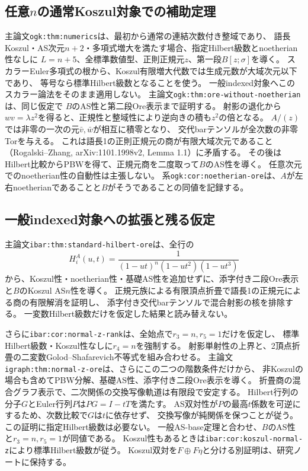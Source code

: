 \documentclass[11pt,a4paper]{ltjsarticle}
\begin{document}
\subsection{任意\texorpdfstring{$n$}{n}の通常Koszul対象での補助定理}
主論文\texttt{ogk:thm:numerics}は、最初から通常の連結次数付き整域であり、
語長Koszul・AS次元$n+2$・多項式増大を満たす場合、指定Hilbert級数とnoetherian性なしに
$L=n+5$、全標準数値型、正則正規元$z$、第一段$B[z;\sigma]$を導く。
スカラーEuler多項式の根から、Koszul有限増大代数では生成元数が大域次元以下であり、
等号なら標準Hilbert級数となることを使う。
一般indexed対象へこのスカラー論法をそのまま適用しない。
主論文\texttt{ogk:thm:ore-without-noetherian}は、同じ仮定で
$B$のAS性と第二段Ore表示まで証明する。
射影の退化から$wv=\lambda z^2$を得ると、正規性と整域性により逆向きの積も$z^2$の倍となる。
$A/(z)$では非零の一次の元$\bar v,\bar w$が相互に積零となり、
交代barテンソルが全次数の非零Torを与える。
これは語長1の正則正規元の商が有限大域次元であること
（Rogalski--Zhang, arXiv:1101.1998v2, Lemma 1.1）に矛盾する。
その後はHilbert比較からPBWを得て、正規元商を二度取って$B$のAS性を導く。
任意次元でのnoetherian性の自動性は主張しない。
系\texttt{ogk:cor:noetherian-ore}は、$A$が左右noetherianであることと$B$がそうであることの同値を記録する。

\subsection{一般indexed対象への拡張と残る仮定}
主論文\texttt{ibar:thm:standard-hilbert-ore}は、全行の
\[
H_i^A(u,t)=\frac1{(1-ut)^n(1-ut^2)(1-ut^3)}
\]
から、Koszul性・noetherian性・基礎AS性を追加せずに、添字付き二段Ore表示と$B$のKoszul AS$n$性を導く。
正規元族による有限頂点折畳で語長1の正規元による商の有限解消を証明し、
添字付き交代barテンソルで混合射影の核を排除する。
一変数Hilbert級数だけを仮定した結果と読み替えない。

さらに\texttt{ibar:cor:normal-z-rank}は、全始点で$r_3=n,r_5=1$だけを仮定し、
標準Hilbert級数・Koszul性なしに$r_4=n$を強制する。
射影単射性の上界と、2頂点折畳の二変数Golod--Shafarevich不等式を組み合わせる。
主論文\texttt{igraph:thm:normal-z-ore}は、さらにこの二つの階数条件だけから、
非Koszulの場合も含めてPBW分解、基礎AS性、添字付き二段Ore表示を導く。
折畳商の混合グラフ表示で、二次関係の交換写像軌道は有限段で安定する。
Hilbert行列の分子$G$とEuler行列$P$は$PG=I-tT$を満たす。
AS双対性が$P$の最高$t$係数を可逆にするため、次数比較で$G$は$t$に依存せず、
交換写像が純関係を保つことが従う。この証明に指定Hilbert級数は必要ない。
一般AS-base定理と合わせ、$B$のAS性と$r_3=n,r_5=1$が同値である。
Koszul性もあるときは\texttt{ibar:cor:koszul-normal-z}により標準Hilbert級数が従う。
Koszul双対を$F\oplus F\eta$と分ける別証明は、研究ノートに保持する。
\end{document}
